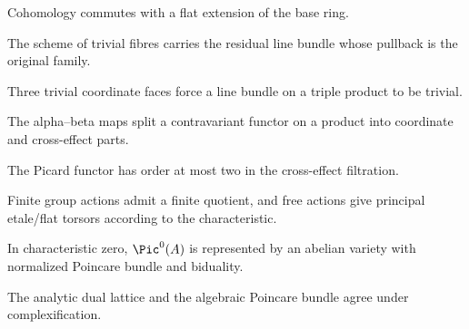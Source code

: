 \begin{remark}
\label{ch02-sec05-flat-base-change}
Cohomology commutes with a flat extension of the base ring.
\notready
\end{remark}

\begin{remark}
\label{ch02-sec05-seesaw}
The scheme of trivial fibres carries the residual line bundle whose pullback is
the original family.
\notready
\end{remark}

\begin{remark}
\label{ch02-sec06-cube-theorem}
Three trivial coordinate faces force a line bundle on a triple product to be
trivial.
\notready
\end{remark}

\begin{remark}
\label{ch02-sec06-product-splitting}
The alpha--beta maps split a contravariant functor on a product into coordinate
and cross-effect parts.
\notready
\end{remark}

\begin{remark}
\label{ch02-sec06-order-functor}
The Picard functor has order at most two in the cross-effect filtration.
\notready
\end{remark}

\begin{remark}
\label{ch02-sec07-quotient}
Finite group actions admit a finite quotient, and free actions give principal
etale/flat torsors according to the characteristic.
\notready
\end{remark}

\begin{remark}
\label{ch02-sec08-dual}
In characteristic zero, $\Pic^0(A)$ is represented by an abelian variety with
normalized Poincare bundle and biduality.
\notready
\end{remark}

\begin{remark}
\label{ch02-sec09-comparison}
The analytic dual lattice and the algebraic Poincare bundle agree under
complexification.
\notready
\end{remark}

